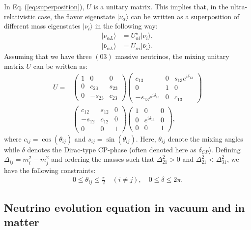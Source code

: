 \documentclass[twocolumn,secnumarabic,amssymb, nobibnotes, aps, prd,10pt]{revtex4-1}
\newcommand{\kt}[1]{\vert #1 \rangle}
\newcommand{\Eq}[1]{Eq.$\:$(\ref{#1})}
\begin{document}
In \Eq{eq:superposition}, $U$ is a unitary matrix. This implies that, in the ultra-relativistic case, the flavor eigenstate
$\kt{\nu_\alpha}$ can be written as a superposition of different mass eigenstates $\kt{\nu_i}$
in the following way:
\begin{align}
\kt{\nu_{\alpha L}} &= U^\star_{\alpha i} \kt{\nu_i}, \\
\kt{\bar{\nu}_{\alpha L}} &= U_{\alpha i} \kt{\bar{\nu}_i}.
\end{align}
Assuming that we have three $(03)$ massive neutrinos, the mixing unitary matrix $U$ can 
be written as:
\begin{align}
U = & \left(\begin{array}{ccc}
1 & 0 & 0 \\
0 & c_{23} & s_{23} \\
0 & -s_{23} & c_{23}
\end{array}\right)\left(\begin{array}{ccc}
c_{13} & 0 & s_{13} e^{\mathrm{i} \delta_{13}} \\
0 & 1 & 0 \\
-s_{13} e^{\mathrm{i} \delta_{13}} & 0 & c_{13}
\end{array}\right) \nonumber \\
& \left(\begin{array}{ccc}
c_{12} & s_{12} & 0 \\
-s_{12} & c_{12} & 0 \\
0 & 0 & 1
\end{array}\right)\left(\begin{array}{ccc}
1 & 0 & 0 \\
0 & e^{ \mathrm{i} \delta_{13} } & 0 \\
0 & 0 & 1
\end{array}\right) ,
\label{eq:evolution_matrix}
\end{align}
where $c_{ij} = \cos(\theta_{ij})$ and $s_{ij} = \sin(\theta_{ij})$. Here, $\theta_{ij}$
denote the mixing angles while $\delta$ denotes the Dirac-type CP-phase (often denoted 
here as $\delta_{CP}$). Defining $\Delta_{ij} = m_i^2 - m_j^2$ and ordering the masses 
such that $\Delta_{21}^2 > 0$ and $\Delta_{21}^2 < \Delta_{31}^2$, we have the following 
constraints:
\begin{align}
0 \leq \theta_{ij} \leq \frac{\pi}{2} \quad (i \neq j), \quad 0 \leq \delta \leq 2 \pi .
\end{align}


\subsection{Neutrino evolution equation in vacuum and in matter}
\label{subsec:evoleq}
\end{document}
